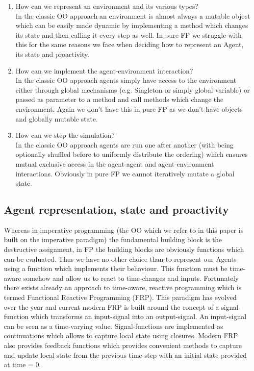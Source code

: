 \begin{enumerate}
	\item How can we represent an environment and its various types? \\
	In the classic OO approach an environment is almost always a mutable object which can be easily made dynamic by implementing a method which changes its state and then calling it every step as well. In pure FP we struggle with this for the same reasons we face when deciding how to represent an Agent, its state and proactivity.
	
	\item How can we implement the agent-environment interaction? \\
	In the classic OO approach agents simply have access to the environment either through global mechanisms (e.g. Singleton or simply global variable) or passed as parameter to a method and call methods which change the environment. Again we don't have this in pure FP as we don't have objects and globally mutable state.
	
	\item How can we step the simulation? \\
	In the classic OO approach agents are run one after another (with being optionally shuffled before to uniformly distribute the ordering) which ensures mutual exclusive access in the agent-agent and agent-environment interactions. Obviously in pure FP we cannot iteratively mutate a global state.
\end{enumerate}

\subsection{Agent representation, state and proactivity}
Whereas in imperative programming (the OO which we refer to in this paper is built on the imperative paradigm) the fundamental building block is the destructive assignment, in FP the building blocks are obviously functions which can be evaluated.
Thus we have no other choice than to represent our Agents using a function which implements their behaviour. This function must be time-aware somehow and allow us to react to time-changes and inputs. Fortunately there exists already an approach to time-aware, reactive programming which is termed Functional Reactive Programming (FRP). This paradigm has evolved over the year and current modern FRP is built around the concept of a signal-function which transforms an input-signal into an output-signal. An input-signal can be seen as a time-varying value. Signal-functions are implemented as continuations which allows to capture local state using closures. Modern FRP also provides feedback functions which provides convenient methods to capture and update local state from the previous time-step with an initial state provided at time = 0.


